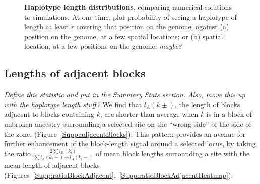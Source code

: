 \documentclass[11pt,letterpaper]{article}
\newcommand{\plr}[1]{{\em \color{blue} #1}}
\begin{document}
\begin{figure}
    \begin{center}
    \end{center}
    \caption{
        \textbf{Haplotype length distributions},
        comparing numerical solutions to simulations.
        At one time, plot 
        probability of seeing a haplotype of length at least $r$ covering that position on the genome,
        against (a) position on the genome, at a few spatial locations;
        or (b) spatial location, at a few positions on the genome.
        \plr{maybe?}
        \label{fig:haplotype_lengths}
    }
\end{figure}




\subsection*{Lengths of adjacent blocks}

\plr{Define this statistic and put in the Summary Stats section. Also, move this up with the haplotype length stuff?}
We find that $l_A(k\pm)$, the length of blocks adjacent to blocks containing $k$, are shorter than average when $k$ is in a block of unbroken ancestry surrounding a selected site on the ``wrong side'' of the side of the zone.  (Figure~\ref{Supp:adjacentBlocks}). This pattern provides an avenue for further enhancement of the block-length signal around a selected locus, by taking the ratio $\frac{2\sum{l_B(k_i)}}{\sum{l_A(k_i+)+l_A(k_i-)}}$ of mean block lengths surrounding a site with the mean length of adjacent blocks (Figures~\ref{Supp:ratioBlockAdjacent},~\ref{Supp:ratioBlockAdjacentHeatmap}).




\end{document}
